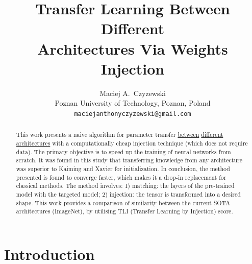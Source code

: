 \documentclass{article} %
\title{
Transfer Learning Between Different \\ Architectures Via Weights Injection
}
\author{Maciej A.~Czyzewski \\
Poznan University of Technology, Poznan, Poland\\
\texttt{maciejanthonyczyzewski@gmail.com} \\
}
\begin{document}
\maketitle
{} %


\begin{abstract}
This work presents a naive algorithm for parameter transfer
\underline{between} \underline{different} \underline{architectures} with a computationally cheap injection technique (which does not require data).
%
The primary objective is to speed up the training of neural networks from scratch.
%
It was found in this study that transferring knowledge from any architecture was superior to Kaiming and Xavier for initialization.
%
In conclusion, the method presented is found to converge faster, which makes it a drop-in replacement for classical methods.
%
The method involves:
1) matching: the layers of the pre-trained model with the targeted model;
2) injection: the tensor is transformed into a desired shape.
%
This work provides a comparison of similarity between the current SOTA
architectures (ImageNet), by utilising TLI (Transfer Learning by Injection)
score.
\end{abstract}

\newcommand{\ComboInjection}{\ensuremath{\text{ComboInjection}}}


\section{Introduction}
\end{document}
